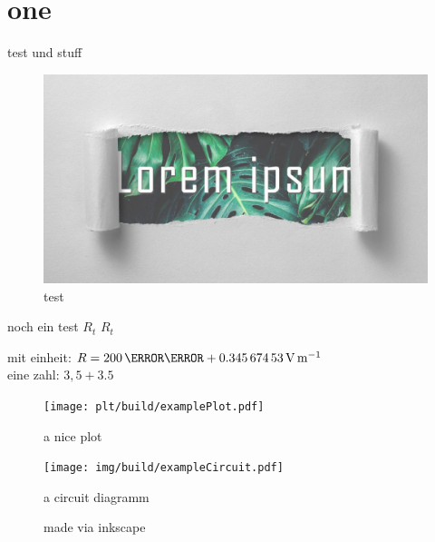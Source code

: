 \documentclass[11pt,a4paper,twoside,f1,ngerman]{HsH-report}
\begin{document}
\maketitle
\declarationAuthorship

\begin{abstract}
	\lipsum[5-8]
\end{abstract}

\tableofcontents

\cleardoublepage %

\chapter{one}
	\label{chap: one}
	{\color{red}test} und stuff
	\begin{figure}
		\centering
		\includegraphics[width=.6\textwidth]{img/lorem-ipsum.jpg}
		\caption{test}
	\end{figure}

	noch ein test \normalsubscripts$R_t$ \upsubscripts$R_t$

	mit einheit: $R=200\,\milli\ohm+ \SI{0.34567453}{\volt\per\metre}$
	\cite{laboranleitung:physik}
	\vspace{2cm}\\\pagebreak
	eine zahl: $3,5+3.5$\\

	\begin{figure}
		\centering
		\texttt{[image: plt/build/examplePlot.pdf]}
		\caption{a nice plot}
	\end{figure}

	\begin{figure}
		\centering
		\texttt{[image: img/build/exampleCircuit.pdf]}
		\caption{a circuit diagramm}
	\end{figure}

	\begin{figure}
		\centering
		\graphicspath{{img/build/}} %
		
		\caption{made via inkscape}
	\end{figure}

\printbibliography
\listoffigures
\end{document}
